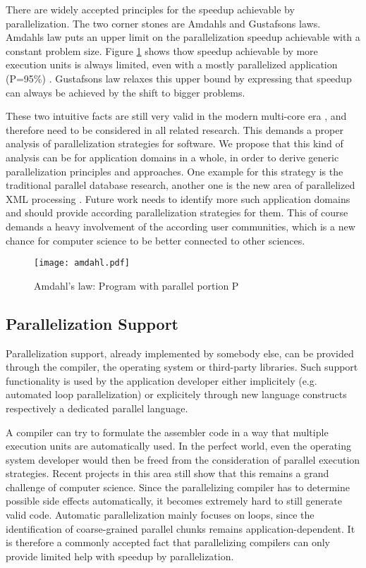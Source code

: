 \documentclass[a4paper]{article}
\begin{document}
There are widely accepted principles for the speedup achievable by parallelization. The two corner stones are Amdahls and Gustafsons laws. Amdahls law \cite{amdahl} puts an upper limit on the parallelization speedup achievable with a constant problem size. Figure \ref{fig:amdahl} shows thow speedup achievable by more execution units is always limited, even with a mostly parallelized application (P=95\%) . Gustafsons law \cite{gustafson} relaxes this upper bound by expressing that speedup can always be achieved by the shift to bigger problems. 

These two intuitive facts are still very valid in the modern multi-core era \cite{amdahlmulticore}, and therefore need to be considered in all related research. This demands a proper analysis of parallelization strategies for software. We propose that this kind of analysis can be for application domains in a whole, in order to derive generic parallelization principles and approaches. One example for this strategy is the traditional parallel database research, another one is the new area of parallelized XML processing \cite{head07, lu08}. Future work needs to identify more such application domains and should provide according parallelization strategies for them. This of course demands a heavy involvement of the according user communities, which is a new chance for computer science to be better connected to other sciences.  

\begin{figure}
\centering
\texttt{[image: amdahl.pdf]}
\caption{Amdahl's law: Program with parallel portion P}
\label{fig:amdahl}
\end{figure}

\subsection*{Parallelization Support}

Parallelization support, already implemented by somebody else, can be provided through the compiler, the operating system or third-party libraries. Such support functionality is used by the application developer either implicitely (e.g. automated loop parallelization) or explicitely through new language constructs respectively a dedicated parallel language.

A compiler can try to formulate the assembler code in a way that multiple execution units are automatically used. In the perfect world, even the operating system developer would then be freed from the consideration of parallel execution strategies. Recent projects in this area \cite{polaris} still show that this remains a grand challenge of computer science. Since the parallelizing compiler has to determine possible side effects automatically, it becomes extremely hard to still generate valid code. Automatic parallelization mainly focuses on loops, since the identification of coarse-grained parallel chunks remains application-dependent. It is therefore a commonly accepted fact that parallelizing compilers can only provide limited help with speedup by parallelization. 
\end{document}
